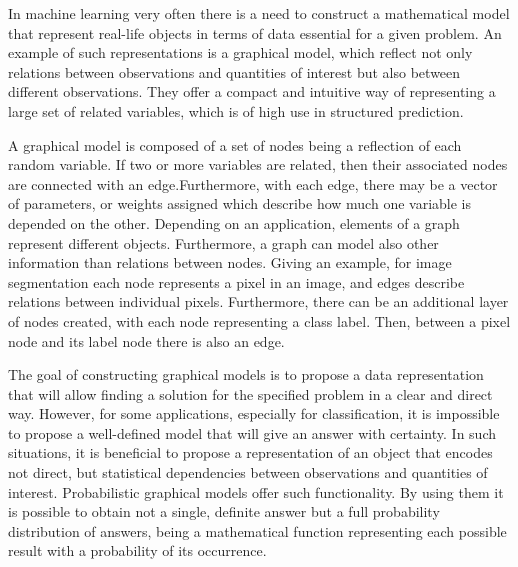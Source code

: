 In machine learning very often there is a need to construct a mathematical model that represent real-life objects in terms of data essential for a given problem. An example of such representations is a graphical model, which reflect not only relations between observations and quantities of interest but also between different observations. They offer a compact and intuitive way of representing a large set of related variables, which is of high use in structured prediction. 

A graphical model is composed of a set of nodes being a reflection of each random variable. If two or more variables are related, then their associated nodes are connected with an edge.Furthermore, with each edge, there may be a vector of parameters, or weights assigned which describe how much one variable is depended on the other. Depending on an application, elements of a graph represent different objects. Furthermore, a graph can model also other information than relations between nodes. Giving an example, for image segmentation each node represents a pixel in an image, and edges describe relations between individual pixels. Furthermore, there can be an additional layer of nodes created, with each node representing a class label. Then, between a pixel node and its label node there is also an edge.

The goal of constructing graphical models is to propose a data representation that will allow finding a solution for the specified problem in a clear and direct way. However, for some applications, especially for classification, it is impossible to propose a well-defined model that will give an answer with certainty. In such situations, it is beneficial to propose a representation of an object that encodes not direct, but statistical dependencies between observations and quantities of interest. Probabilistic graphical models offer such functionality. By using them it is possible to obtain not a single, definite answer but a full probability distribution of answers, being a mathematical function representing each possible result with a probability of its occurrence. 

